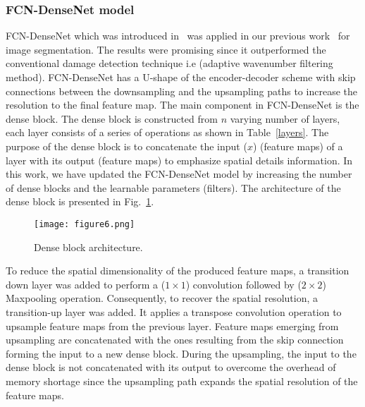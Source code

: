 \subsubsection{FCN-DenseNet model}
FCN-DenseNet which was introduced in~\cite{Jegou} was applied in our previous work~\cite{Ijjeh2021} for image segmentation.
The results were promising since it outperformed the conventional damage detection technique i.e (adaptive wavenumber filtering method). 
FCN-DenseNet has a U-shape of the encoder-decoder scheme with skip connections between the downsampling and the upsampling paths to increase the resolution to the final feature map.
The main component in FCN-DenseNet is the dense block.
The dense block is constructed from \(n\) varying number of layers, each layer consists of a series of operations as shown in Table~\ref{layers}.
The purpose of the dense block is to concatenate the input (\(x\)) (feature maps) of a layer with its output (feature maps) to emphasize spatial details information.
In this work, we have updated the FCN-DenseNet model by increasing the number of dense blocks and the learnable parameters (filters).
The architecture of the dense block is presented in Fig.~\ref{dense_block}. 
\begin{figure} [h!]
	\begin{center}
		\texttt{[image: figure6.png]}
	\end{center}
	\caption{Dense block architecture.} 
	\label{dense_block}
\end{figure}
To reduce the spatial dimensionality of the produced feature maps, a transition down layer was added to perform a (\(1\times 1\)) convolution followed by (\(2\times2\)) Maxpooling operation. 
Consequently, to recover the spatial resolution, a transition-up layer was added. 
It applies a transpose convolution operation to upsample feature maps from the previous layer.
Feature maps emerging from upsampling are concatenated with the ones resulting from the skip connection forming the input to a new dense block.
During the upsampling, the input to the dense block is not concatenated with its output to overcome the overhead of memory shortage since the upsampling path expands the spatial resolution of the feature maps. 
